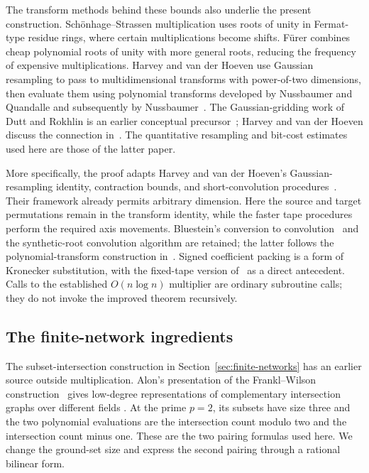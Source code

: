 \documentclass[11pt]{article}
\theoremstyle{definition}
\begin{document}
The transform methods behind these bounds also underlie the present
construction. Sch\"onhage--Strassen multiplication uses roots of unity in
Fermat-type residue rings, where certain multiplications become shifts.
F\"urer combines cheap polynomial roots of unity with more general roots,
reducing the frequency of expensive multiplications. Harvey and van der
Hoeven use Gaussian resampling to pass to multidimensional transforms with
power-of-two dimensions, then evaluate them using polynomial transforms
developed by Nussbaumer and Quandalle and subsequently by
Nussbaumer~\cite{NussbaumerQuandalle1978,Nussbaumer1980,HarveyHoeven2021}.
The Gaussian-gridding work of Dutt and Rokhlin is an earlier conceptual
precursor~\cite{DuttRokhlin1993}; Harvey and van der Hoeven discuss the
connection in~\cite[Section~4.4.3]{HarveyHoeven2021}. The quantitative
resampling and bit-cost estimates used here are those of the latter paper.

More specifically, the proof adapts Harvey and van der Hoeven's
Gaussian-resampling identity, contraction bounds, and short-convolution
procedures~\cite[Theorem~4.2, Proposition~4.7 and Lemmas~4.8--4.12]{HarveyHoeven2021}.
Their framework already permits arbitrary dimension. Here the source and
target permutations remain in the transform identity, while the faster tape
procedures perform the required axis movements. Bluestein's conversion to
convolution~\cite{Bluestein1970} and the synthetic-root convolution algorithm
are retained; the latter follows the polynomial-transform construction
in~\cite[Section~2.4 and Section~3]{HarveyHoeven2021}. Signed coefficient
packing is a form of Kronecker substitution, with the fixed-tape version
of~\cite[Lemma~2.5]{HarveyHoeven2021} as a direct antecedent.
Calls to the established $O(n\log n)$ multiplier are ordinary subroutine
calls; they do not invoke the improved theorem recursively.

\subsection{The finite-network ingredients}

The subset-intersection construction in Section~\ref{sec:finite-networks}
has an earlier source outside multiplication. Alon's presentation of the
Frankl--Wilson construction~\cite{FranklWilson1981} gives low-degree
representations of complementary intersection graphs over different fields
\cite[Section~3, remark after the proof of Theorem~1.1]{Alon1998}.
At the prime $p=2$, its subsets have size three and the two polynomial evaluations
are the intersection count modulo two and the intersection count minus one.
These are the two pairing formulas used here. We change the ground-set
size and express the second pairing through a rational bilinear form.
\end{document}
